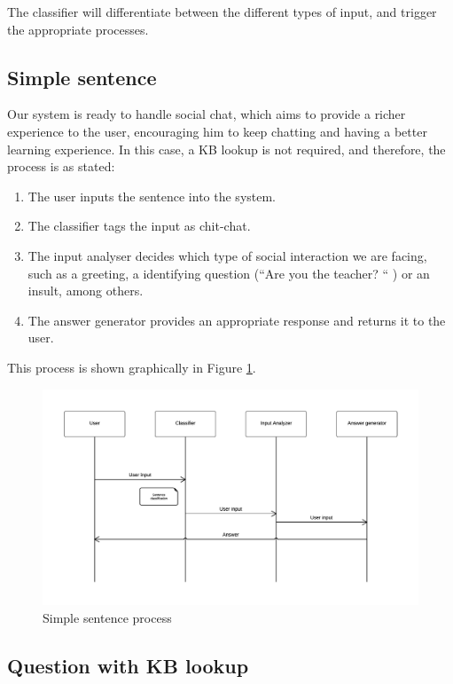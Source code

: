 
The classifier will differentiate between the different types of input, and trigger the appropriate processes.

\subsection{Simple sentence}

Our system is ready to handle social chat, which aims to provide a richer experience to the user, encouraging him to keep chatting and having a better learning experience. In this case, a \ac{KB} lookup is not required, and therefore, the process is as stated:

\begin{enumerate}
 \item The user inputs the sentence into the system.
 \item The classifier tags the input as chit-chat.
 \item The input analyser decides which type of social interaction we are facing, such as a greeting, a identifying question (``Are you the teacher? `` ) or an insult, among others.
 \item The answer generator provides an appropriate response and returns it to the user.
\end{enumerate}

This process is shown graphically in Figure \ref{fig:arch2}.

\begin{figure}[!htbp]
    \centering
    \includegraphics[width=\textwidth]{img/arch/SimpleSentence.png}
    \caption{Simple sentence process}
    \label{fig:arch2}
\end{figure}

\subsection{Question with \ac{KB} lookup}

